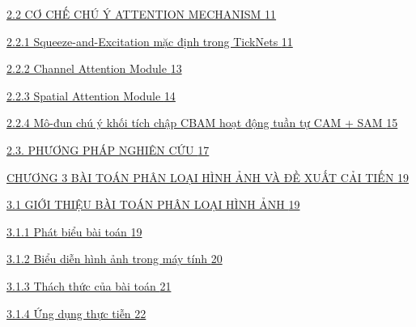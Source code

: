 \documentclass[
  12pt,
  a4paper,
]{report}
\begin{document}
\hyperref[cux1a1-chux1ebf-chuxfa-uxfd-attention-mechanism]{2.2 CƠ CHẾ
CHÚ Ý ATTENTION MECHANISM
\hyperref[cux1a1-chux1ebf-chuxfa-uxfd-attention-mechanism]{11}}

\hyperref[squeeze-and-excitation-mux1eb7c-ux111ux1ecbnh-trong-ticknets]{2.2.1
Squeeze-and-Excitation mặc định trong TickNets
\hyperref[squeeze-and-excitation-mux1eb7c-ux111ux1ecbnh-trong-ticknets]{11}}

\hyperref[channel-attention-module]{2.2.2 Channel Attention Module
\hyperref[channel-attention-module]{13}}

\hyperref[spatial-attention-module]{2.2.3 Spatial Attention Module
\hyperref[spatial-attention-module]{14}}

\hyperref[muxf4-ux111un-chuxfa-uxfd-khux1ed1i-tuxedch-chux1eadp-cbam-houx1ea1t-ux111ux1ed9ng-tuux1ea7n-tux1ef1-cam-sam]{2.2.4
Mô-đun chú ý khối tích chập CBAM hoạt động tuần tự CAM + SAM
\hyperref[muxf4-ux111un-chuxfa-uxfd-khux1ed1i-tuxedch-chux1eadp-cbam-houx1ea1t-ux111ux1ed9ng-tuux1ea7n-tux1ef1-cam-sam]{15}}

\hyperref[phux1b0ux1a1ng-phuxe1p-nghiuxean-cux1ee9u]{2.3. PHƯƠNG PHÁP
NGHIÊN CỨU \hyperref[phux1b0ux1a1ng-phuxe1p-nghiuxean-cux1ee9u]{17}}

\hyperref[chux1b0ux1a1ng-3-buxe0i-touxe1n-phuxe2n-loux1ea1i-huxecnh-ux1ea3nh-vuxe0-ux111ux1ec1-xuux1ea5t-cux1ea3i-tiux1ebfn]{CHƯƠNG
3 BÀI TOÁN PHÂN LOẠI HÌNH ẢNH VÀ ĐỀ XUẤT CẢI TIẾN
\hyperref[chux1b0ux1a1ng-3-buxe0i-touxe1n-phuxe2n-loux1ea1i-huxecnh-ux1ea3nh-vuxe0-ux111ux1ec1-xuux1ea5t-cux1ea3i-tiux1ebfn]{19}}

\hyperref[giux1edbi-thiux1ec7u-buxe0i-touxe1n-phuxe2n-loux1ea1i-huxecnh-ux1ea3nh]{3.1
GIỚI THIỆU BÀI TOÁN PHÂN LOẠI HÌNH ẢNH
\hyperref[giux1edbi-thiux1ec7u-buxe0i-touxe1n-phuxe2n-loux1ea1i-huxecnh-ux1ea3nh]{19}}

\hyperref[phuxe1t-biux1ec3u-buxe0i-touxe1n]{3.1.1 Phát biểu bài toán
\hyperref[phuxe1t-biux1ec3u-buxe0i-touxe1n]{19}}

\hyperref[biux1ec3u-diux1ec5n-huxecnh-ux1ea3nh-trong-muxe1y-tuxednh]{3.1.2
Biểu diễn hình ảnh trong máy tính
\hyperref[biux1ec3u-diux1ec5n-huxecnh-ux1ea3nh-trong-muxe1y-tuxednh]{20}}

\hyperref[thuxe1ch-thux1ee9c-cux1ee7a-buxe0i-touxe1n]{3.1.3 Thách thức
của bài toán \hyperref[thuxe1ch-thux1ee9c-cux1ee7a-buxe0i-touxe1n]{21}}

\hyperref[ux1ee9ng-dux1ee5ng-thux1ef1c-tiux1ec5n]{3.1.4 Ứng dụng thực
tiễn \hyperref[ux1ee9ng-dux1ee5ng-thux1ef1c-tiux1ec5n]{22}}
\end{document}
